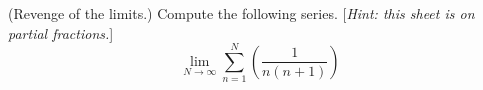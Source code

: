 \begin{questions}
  \questioS (Revenge of the limits.) Compute the following series. [\textit{Hint: this sheet is on partial fractions.}]
            \begin{displaymath}
              \lim_{N \to \infty} \sum^N_{n = 1} \left( \frac{1}{n(n + 1)} \right)
            \end{displaymath}

\end{questions}

